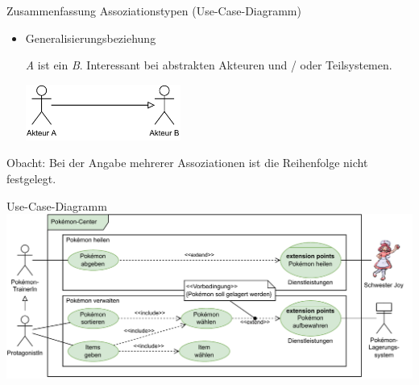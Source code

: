 \begin{defi}{Zusammenfassung Assoziationstypen (Use-Case-Diagramm)}
\begin{itemize}
        \item Generalisierungsbeziehung

              \emph{A} ist ein \emph{B}.
              Interessant bei abstrakten Akteuren und / oder Teilsystemen.

              \vspace{1em}
              \begin{center}
                  \includegraphics[width=0.4\textwidth]{includes/figures/defi_diagrams_use_case_generalisierung.pdf}
              \end{center}
    \end{itemize}

    Obacht: Bei der Angabe mehrerer Assoziationen ist die Reihenfolge nicht festgelegt.
\end{defi}

\begin{example}{Use-Case-Diagramm}
    \includegraphics[width=\textwidth]{includes/figures/example_diagrams_use_case.pdf}
\end{example}

